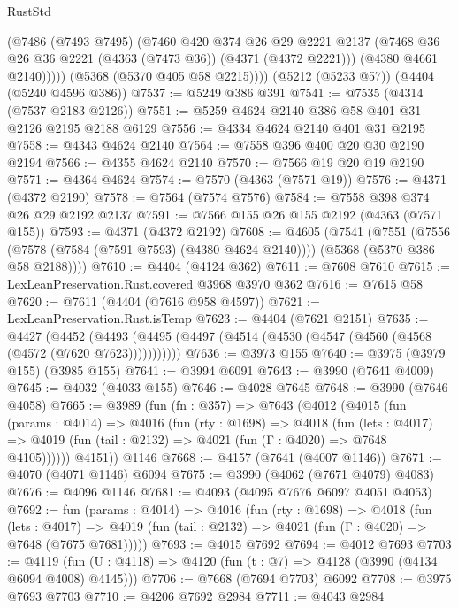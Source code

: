 \begin{lexlean}{RustStd}
\begin{coremodule}
{\begin{coremodule}
{{{{{{{{{{{{{{{{            (@7486
              (@7493 @7495)
              (@7460
                @420
                @374
                @26
                @29
                @2221
                @2137
                (@7468 @36 @26 @36 @2221 (@4363 (@7473 @36)) (@4371 (@4372 @2221)))
                (@4380 @4661 @2140)))))
        (@5368 (@5370 @405 @58 @2215))))
    (@5212 (@5233 @57))
    (@4404 (@5240 @4596 @386))
@7537 := @5249 @386 @391
@7541 := @7535 (@4314 (@7537 @2183 @2126))
@7551 := @5259 @4624 @2140 @386 @58 @401 @31 @2126 @2195 @2188 @6129
@7556 := @4334 @4624 @2140 @401 @31 @2195
@7558 := @4343 @4624 @2140
@7564 := @7558 @396 @400 @20 @30 @2190 @2194
@7566 := @4355 @4624 @2140
@7570 := @7566 @19 @20 @19 @2190
@7571 := @4364 @4624
@7574 := @7570 (@4363 (@7571 @19))
@7576 := @4371 (@4372 @2190)
@7578 := @7564 (@7574 @7576)
@7584 := @7558 @398 @374 @26 @29 @2192 @2137
@7591 := @7566 @155 @26 @155 @2192 (@4363 (@7571 @155))
@7593 := @4371 (@4372 @2192)
@7608 := @4605
    (@7541
      (@7551
        (@7556 (@7578 (@7584 (@7591 @7593) (@4380 @4624 @2140))))
        (@5368 (@5370 @386 @58 @2188))))
@7610 := @4404 (@4124 @362)
@7611 := @7608 @7610
@7615 := LexLeanPreservation.Rust.covered @3968 @3970 @362
@7616 := @7615 @58
@7620 := @7611 (@4404 (@7616 @958 @4597))
@7621 := LexLeanPreservation.Rust.isTemp
@7623 := @4404 (@7621 @2151)
@7635 := @4427
    (@4452 (@4493 (@4495 (@4497 (@4514 (@4530 (@4547 (@4560 (@4568 (@4572 (@7620 @7623)))))))))))
@7636 := @3973 @155
@7640 := @3975 (@3979 @155) (@3985 @155)
@7641 := @3994 @6091
@7643 := @3990 (@7641 @4009)
@7645 := @4032 (@4033 @155)
@7646 := @4028 @7645
@7648 := @3990 (@7646 @4058)
@7665 := @3989
    (fun (fn : @357) =>
    @7643
      (@4012
        (@4015
          (fun (params : @4014) =>
          @4016
            (fun (rty : @1698) =>
            @4018
              (fun (lets : @4017) =>
              @4019 (fun (tail : @2132) => @4021 (fun (Γ : @4020) => @7648 @4105))))))
        @4151))
    @1146
@7668 := @4157 (@7641 (@4007 @1146))
@7671 := @4070 (@4071 @1146) @6094
@7675 := @3990 (@4062 (@7671 @4079) @4083)
@7676 := @4096 @1146
@7681 := @4093 (@4095 @7676 @6097 @4051 @4053)
@7692 := fun (params : @4014) =>
  @4016
    (fun (rty : @1698) =>
    @4018
      (fun (lets : @4017) =>
      @4019 (fun (tail : @2132) => @4021 (fun (Γ : @4020) => @7648 (@7675 @7681)))))
@7693 := @4015 @7692
@7694 := @4012 @7693
@7703 := @4119 (fun (U : @4118) => @4120 (fun (t : @7) => @4128 (@3990 (@4134 @6094 @4008) @4145)))
@7706 := @7668 (@7694 @7703) @6092
@7708 := @3975 @7693 @7703
@7710 := @4206 @7692 @2984
@7711 := @4043 @2984
}}}}}}}}}}}}}}}}
\end{coremodule}}
\end{coremodule}
\end{lexlean}
